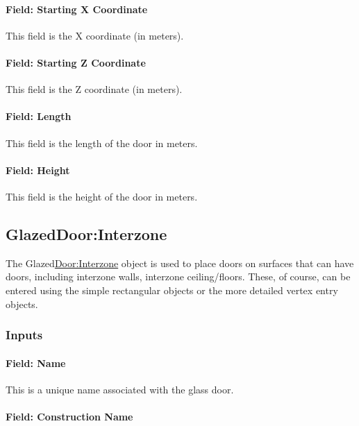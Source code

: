 \paragraph{Field: Starting X Coordinate}\label{field-starting-x-coordinate-14}

This field is the X coordinate (in meters).

\paragraph{Field: Starting Z Coordinate}\label{field-starting-z-coordinate-14}

This field is the Z coordinate (in meters).

\paragraph{Field: Length}\label{field-length-14}

This field is the length of the door in meters.

\paragraph{Field: Height}\label{field-height-8}

This field is the height of the door in meters.

\subsection{GlazedDoor:Interzone}\label{glazeddoorinterzone}

The Glazed\hyperref[doorinterzone]{Door:Interzone} object is used to place doors on surfaces that can have doors, including interzone walls, interzone ceiling/floors. These, of course, can be entered using the simple rectangular objects or the more detailed vertex entry objects.

\subsubsection{Inputs}\label{inputs-19-007}

\paragraph{Field: Name}\label{field-name-15-010}

This is a unique name associated with the glass door.

\paragraph{Field: Construction Name}\label{field-construction-name-15}


